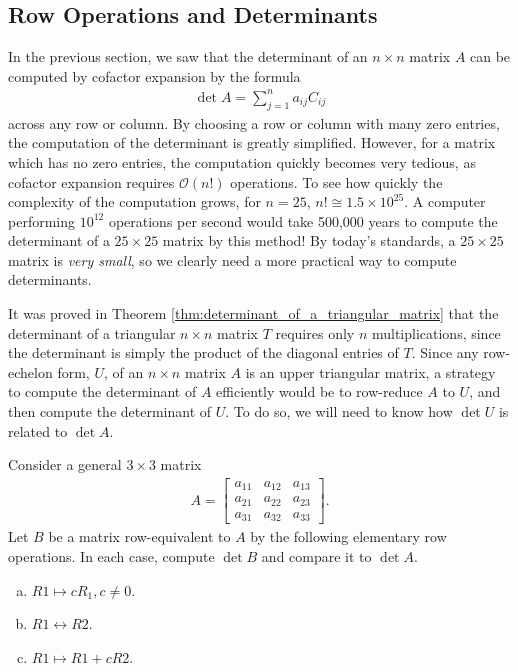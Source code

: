 \documentclass[12pt,letterpaper,reqno]{article}
\numberwithin{equation}{section}
\begin{document}
\subsection{Row Operations and Determinants}
In the previous section, we saw that the determinant of an $n \times n$ matrix $A$ can be computed by cofactor expansion by the formula
\begin{align*}
	\det A=\sum_{j=1}^na_{ij}C_{ij}
\end{align*}
across any row or column. By choosing a row or column with many zero entries, the computation of the determinant is greatly simplified. However, for a matrix which has no zero entries, the computation quickly becomes very tedious, as cofactor expansion requires $\mathcal{O}(n!)$ operations. To see how quickly the complexity of the computation grows, for $n=25$, $n!\cong 1.5 \times 10^{25}$. A computer performing $10^{12}$ operations per second would take 500,000 years to compute the determinant of a $25 \times 25$ matrix by this method! By today's standards, a $25 \times 25$ matrix is \emph{very small}, so we clearly need a more practical way to compute determinants.

It was proved in Theorem \ref{thm:determinant_of_a_triangular_matrix} that the determinant of a triangular $n \times n$ matrix $T$ requires only $n$ multiplications, since the determinant is simply the product of the diagonal entries of $T$. Since any row-echelon form, $U$, of an $n \times n$ matrix $A$ is an upper triangular matrix, a strategy to compute the determinant of $A$ efficiently would be to row-reduce $A$ to $U$, and then compute the determinant of $U$. To do so, we will need to know how $\det U$ is related to $\det A$.

\begin{exercise}
Consider a general $3 \times 3$ matrix
\begin{align*}
	A=\begin{bmatrix}
		a_{11} & a_{12} & a_{13} \\
		a_{21} & a_{22} & a_{23} \\
		a_{31} & a_{32} & a_{33}
	\end{bmatrix}. 
\end{align*}	
Let $B$ be a matrix row-equivalent to $A$ by the following elementary row operations. In each case, compute $\det B$ and compare it to $\det A$.
\begin{enumerate}[(a)]
	\item $R1 \mapsto c R_1, c \neq 0$.
	\item $R1 \leftrightarrow R2$.
	\item $R1 \mapsto R1+cR2$.
\end{enumerate}
\end{exercise}
\end{document}
